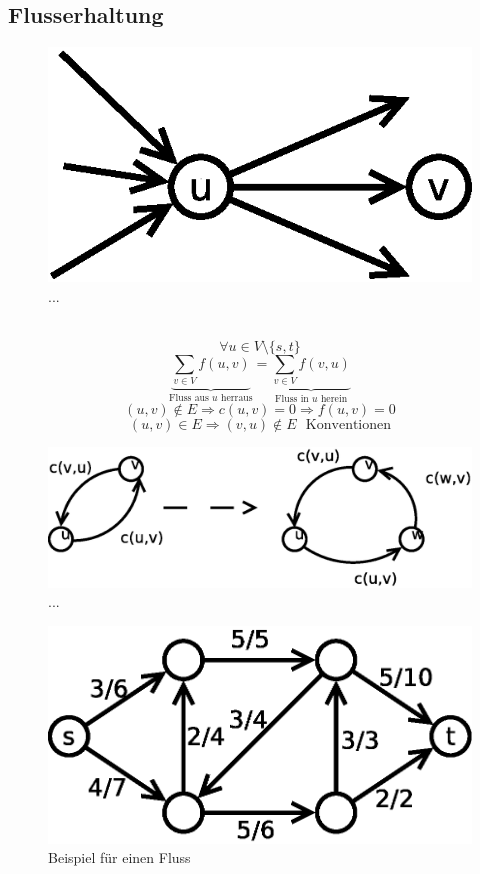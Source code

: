 \subsection{Flusserhaltung}
\begin{figure}
	\centering
	\includegraphics[width=\linewidth]{24/Grafik/Diagramm2}
	\caption{...}
	\label{fig:2}
	\end{figure}
	$ $
\[ \forall u\in V\setminus\{ s,t \} \]
\[  \underset{\text{Fluss aus $u$ herraus}}{\underbrace{\sum_{v\in V} f(u,v)}} = \underset{\text{Fluss in $u$ herein}}{\underbrace{\sum_{v\in V} f(v,u)}}  \]
\[ (u,v) \notin E \Rightarrow c(u,v) = 0 \Rightarrow f(u,v) = 0 \]
\[ (u,v) \in E \Rightarrow (v,u) \notin E~~~\text{Konventionen} \]
\begin{figure}[H]
\centering
\includegraphics[width=0.7\linewidth]{24/Grafik/Diagramm3}
\caption{...}
\label{fig:Diagramm3}
\end{figure}
\begin{figure}[H]
	\centering
	\includegraphics[width=0.7\linewidth]{24/Grafik/Diagramm4}
	\caption{Beispiel für einen Fluss}
	\label{fig:Diagramm4}
\end{figure}


